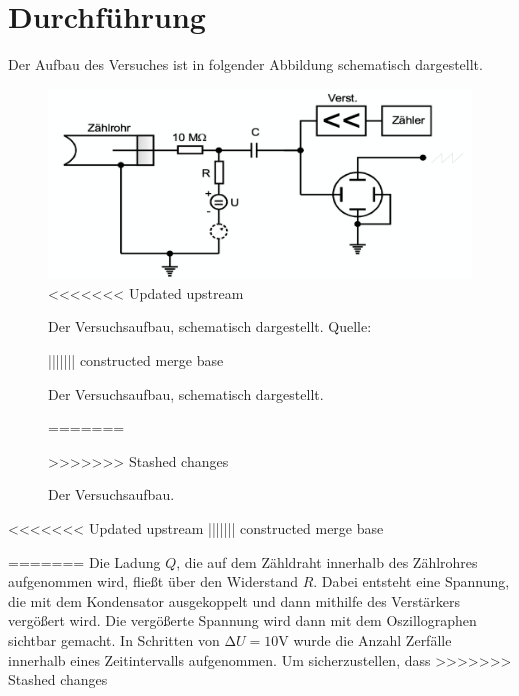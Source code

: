 \section{Durchführung}
\label{sec:Durchführung}
Der Aufbau des Versuches ist in folgender Abbildung schematisch dargestellt.
  \begin{figure}[H]
    \centering
      \includegraphics[scale=0.6]{content/AufbauV703.png}
<<<<<<< Updated upstream
      \caption{Der Versuchsaufbau, schematisch dargestellt. Quelle:\cite{AP01}}
||||||| constructed merge base
      \caption{Der Versuchsaufbau, schematisch dargestellt.}
=======
      \caption{Der Versuchsaufbau.}
>>>>>>> Stashed changes
      \label{fig:aufbau3}
  \end{figure}
<<<<<<< Updated upstream
||||||| constructed merge base

\label{sec:Durchführung}
=======
  Die Ladung $Q$, die auf dem Zähldraht innerhalb des Zählrohres aufgenommen wird, fließt über den
  Widerstand $R$. Dabei entsteht eine Spannung, die mit dem Kondensator ausgekoppelt und dann mithilfe
  des Verstärkers vergößert wird. Die vergößerte Spannung wird dann mit dem Oszillographen sichtbar
  gemacht. In Schritten von $\increment U = 10 \si{\volt}$ wurde die Anzahl Zerfälle innerhalb eines
  Zeitintervalls aufgenommen. Um sicherzustellen, dass    
\label{sec:Durchführung}
>>>>>>> Stashed changes
